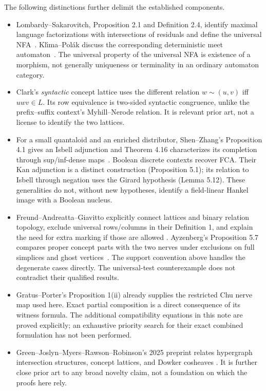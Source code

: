\documentclass[11pt]{article}
\theoremstyle{remark}
\begin{document}
The following distinctions further delimit the established components.
\begin{itemize}
\item Lombardy--Sakarovitch, Proposition 2.1 and Definition 2.4, identify
maximal language factorizations with intersections of residuals and define
the universal NFA~\cite{cg:universal}. Kl\'{\i}ma--Pol\'{a}k discuss the
corresponding deterministic meet automaton~\cite[Section 4]{cg:meet}.
The universal property of the universal NFA is existence of a morphism,
not generally uniqueness or terminality in an ordinary automaton category.
\item Clark's \emph{syntactic} concept lattice uses the different relation
$w\sim(u,v)$ iff $uwv\in L$. Its row equivalence is two-sided syntactic
congruence, unlike the prefix--suffix context's Myhill--Nerode relation.
It is relevant prior art, not a license to identify the two lattices.
\item For a small quantaloid and an enriched distributor, Shen--Zhang's
Proposition 4.1 gives an Isbell adjunction and Theorem 4.16 characterizes
its completion through sup/inf-dense maps~\cite{cg:quantaloid}. Boolean
discrete contexts recover FCA. Their Kan adjunction is a distinct
construction (Proposition 5.1); its relation to Isbell through negation
uses the Girard hypothesis (Lemma 5.12). These generalities do not, without
new hypotheses, identify a field-linear Hankel image with a Boolean nucleus.
\item Freund--Andreatta--Giavitto explicitly connect lattices and binary
relation topology, exclude universal rows/columns in their Definition 1,
and explain the need for extra marking if those are allowed
\cite{cg:freund}. Ayzenberg's Proposition 5.7 compares proper concept
parts with the two nerves under exclusions on full simplices and ghost
vertices~\cite{cg:ayzenberg}. The support convention above handles the
degenerate cases directly. The universal-test counterexample does not
contradict their qualified results.
\item Gratus--Porter's Proposition 1(ii) already supplies the restricted
Chu nerve map used here. Exact partial composition is a direct consequence
of its witness formula. The additional compatibility equations in this
note are proved explicitly; an exhaustive priority search for their exact
combined formulation has not been performed.
\item Green--Joslyn--Myers--Rawson--Robinson's 2025 preprint relates
hypergraph intersection structures, concept lattices, and Dowker cosheaves
\cite{cg:green}. It is further close prior art to any broad novelty claim,
not a foundation on which the proofs here rely.
\end{itemize}
\end{document}
